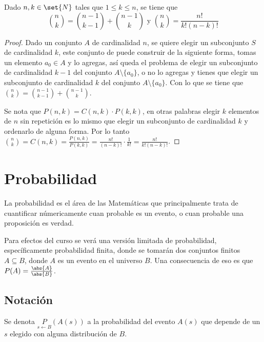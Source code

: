 \documentclass{ayudantia}
\begin{document}
\begin{thm}
    Dado \(n,k\in\set{N}\) tales que \(1\leq k\leq n\), se tiene que
    \begin{equation*}
        \binom{n}{k}=\binom{n-1}{k-1}+\binom{n-1}{k}\text{ y }\binom{n}{k}=\frac{n!}{k!(n-k)!}
    \end{equation*}
\end{thm}

\begin{proof}
    Dado un conjunto \(A\) de cardinalidad \(n\), se quiere elegir un subconjunto \(S\) de cardinalidad \(k\), este conjunto de puede construir de la siguiente forma, tomas un elemento \(a_0\in A\) y lo agregas, así queda el problema de elegir un subconjunto de cardinalidad \(k-1\) del conjunto \(A\setminus\{a_0\}\), o no lo agregas y tienes que elegir un subconjunto de cardinalidad \(k\) del conjunto \(A\setminus\{a_0\}\). Con lo que se tiene que \(\binom{n}{k}=\binom{n-1}{k-1}+\binom{n-1}{k}\).

    Se nota que \(P(n,k)=C(n,k)\cdot P(k,k)\), en otras palabras elegir \(k\) elementos de \(n\) sin repetición es lo mismo que elegir un subconjunto de cardinalidad \(k\) y ordenarlo de alguna forma. Por lo tanto \(\binom{n}{k}=C(n,k)=\frac{P(n,k)}{P(k,k)}=\frac{n!}{(n-k)!}\cdot\frac1{k!}=\frac{n!}{k!(n-k)!}\).
\end{proof}

\section{Probabilidad}
La probabilidad es el área de las Matemáticas que principalmente trata de cuantificar númericamente cuan probable es un evento, o cuan probable una proposición es verdad.
\begin{remark}
    Para efectos del curso se verá una versión limitada de probabilidad, específicamente probabilidad finita, donde se tomarán dos conjuntos finitos \(A\subseteq B\), donde \(A\) es un evento en el universo \(B\). Una consecuencia de eso es que \(P(A)=\frac{\abs{A}}{\abs{B}}\).
\end{remark}
\subsection{Notación}
\begin{defn}
    Se denota \(\underset{s\leftarrow B}{P}(A(s))\) a la probabilidad del evento \(A(s)\) que depende de un \(s\) elegido con alguna distribución de \(B\).
\end{defn}
\end{document}
